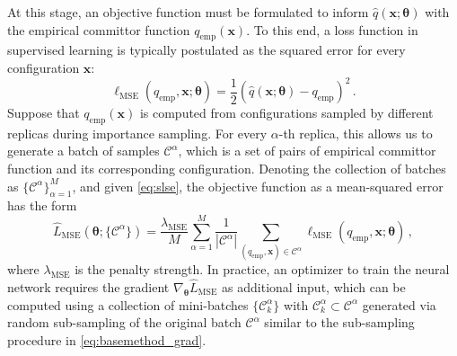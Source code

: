 \documentclass{article}
\numberwithin{equation}{section}
\def\*#1{\mathbf{#1}}
\theoremstyle{definition}
\theoremstyle{remark}
\def\thetab{\boldsymbol{\theta}}
\begin{document}
At this stage, an objective function must be formulated to inform $ \hat{q}(\* x; \thetab) $ with the empirical committor function $ q_\mathrm{emp}(\* x) $.
To this end, a loss function in supervised learning is typically postulated as the squared error for every configuration $\* x$: 
\begin{equation}
    \ell_{\mathrm{MSE}}( q_\mathrm{emp}, \* x; \thetab) = \frac{1}{2}( \hat{q}(\* x; \thetab) - q_\mathrm{emp} )^2 \,. \label{eq:slse}
\end{equation}
Suppose that $q_\mathrm{emp}(\* x)$ is computed from configurations sampled by different replicas during importance sampling. 
For every $\alpha$-th replica, this allows us to generate a batch of samples $\mathcal{C}^\alpha$, which is a set of pairs of empirical committor function and its corresponding configuration. 
Denoting the collection of batches as $\{ \mathcal{C}^\alpha\}_{\alpha=1}^M$,  and given \cref{eq:slse}, the objective function as a mean-squared error has the form 
\begin{equation}
    \hat{L}_{\mathrm{MSE}}(\thetab; \{ \mathcal{C}^\alpha \}) = \frac{\lambda_{\mathrm{MSE}}}{M} \sum_{\alpha=1}^M \frac{1}{|\mathcal{C}^\alpha|} \sum_{(q_{\mathrm{emp}}, \* x) \in \mathcal{C}^\alpha} \ell_{\mathrm{MSE}}(q_\mathrm{emp}, \* x; \thetab)  \label{eq:loss_mse} \,,
\end{equation}
where $ \lambda_{\mathrm{MSE}} $ is the penalty strength. 
In practice, an optimizer to train the neural network requires the gradient $\nabla_{\thetab} \hat{L}_\mathrm{MSE}$ as additional input, which can be computed using a collection of mini-batches $\{ \mathcal{C}^\alpha_k \}$ with $\mathcal{C}^\alpha_k \subset \mathcal{C}^\alpha$ generated via random sub-sampling of the original batch $\mathcal{C}^\alpha$ similar to the sub-sampling procedure in \cref{eq:basemethod_grad}.
\end{document}
